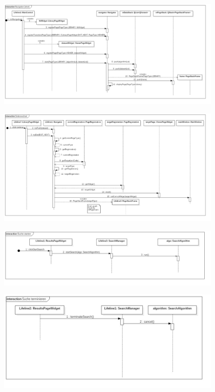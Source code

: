 \begin{figure}[H]
\centering
\includegraphics[width=\linewidth]{img/Sequenzdiagramme/Navigation(short)}
\label{fig:navigation}
\end{figure}

\begin{figure}[H]
\centering
\includegraphics[width=\linewidth]{img/Sequenzdiagramme/Seitenwechsel}
\label{fig:seitenwechsel}
\end{figure}

\begin{figure}[H]
\centering
\includegraphics[width=\linewidth]{img/Sequenzdiagramme/SucheStarten}
\label{fig:sucheStarten}
\end{figure}

\begin{figure}[H]
\centering
\includegraphics[width=\linewidth]{img/Sequenzdiagramme/SucheTerminieren}
\label{fig:sucheTerminieren}
\end{figure}

